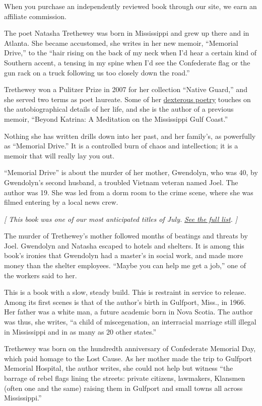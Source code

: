 When you purchase an independently reviewed book through our site, we
earn an affiliate commission.

The poet Natasha Trethewey was born in Mississippi and grew up there and
in Atlanta. She became accustomed, she writes in her new memoir,
``Memorial Drive,'' to the ``hair rising on the back of my neck when I'd
hear a certain kind of Southern accent, a tensing in my spine when I'd
see the Confederate flag or the gun rack on a truck following us too
closely down the road.''

Trethewey won a Pulitzer Prize in 2007 for her collection ``Native
Guard,'' and she served two terms as poet laureate. Some of her
\href{https://www.nytimes3xbfgragh.onion/2018/11/13/books/review-monument-natasha-trethewey.html}{dexterous
poetry} touches on the autobiographical details of her life, and she is
the author of a previous memoir, ``Beyond Katrina: A Meditation on the
Mississippi Gulf Coast.''

Nothing she has written drills down into her past, and her family's, as
powerfully as ``Memorial Drive.'' It is a controlled burn of chaos and
intellection; it is a memoir that will really lay you out.

``Memorial Drive'' is about the murder of her mother, Gwendolyn, who was
40, by Gwendolyn's second husband, a troubled Vietnam veteran named
Joel. The author was 19. She was led from a dorm room to the crime
scene, where she was filmed entering by a local news crew.

\emph{{[} This book was one of our most anticipated titles of July.}
\href{https://www.nytimes3xbfgragh.onion/2020/06/24/books/new-july-books.html}{\emph{See
the full list}}\emph{. {]}}

The murder of Trethewey's mother followed months of beatings and threats
by Joel. Gwendolyn and Natasha escaped to hotels and shelters. It is
among this book's ironies that Gwendolyn had a master's in social work,
and made more money than the shelter employees. ``Maybe you can help me
get a job,'' one of the workers said to her.

This is a book with a slow, steady build. This is restraint in service
to release. Among its first scenes is that of the author's birth in
Gulfport, Miss., in 1966. Her father was a white man, a future academic
born in Nova Scotia. The author was thus, she writes, ``a child of
miscegenation, an interracial marriage still illegal in Mississippi and
in as many as 20 other states.''

Trethewey was born on the hundredth anniversary of Confederate Memorial
Day, which paid homage to the Lost Cause. As her mother made the trip to
Gulfport Memorial Hospital, the author writes, she could not help but
witness ``the barrage of rebel flags lining the streets: private
citizens, lawmakers, Klansmen (often one and the same) raising them in
Gulfport and small towns all across Mississippi.''

